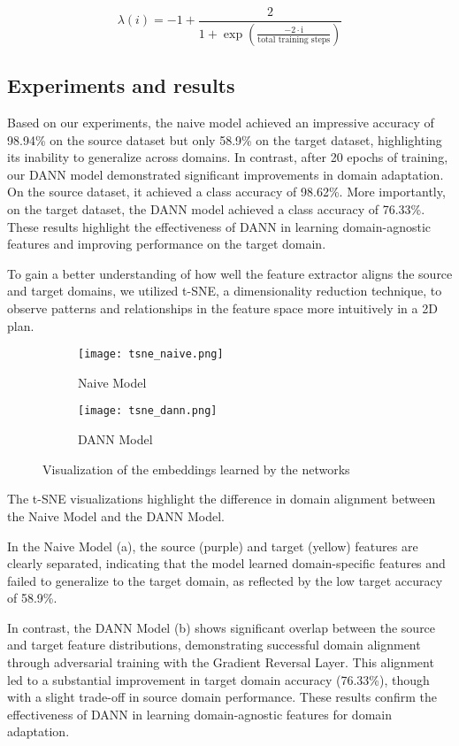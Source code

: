 \documentclass{rapportECL}
\begin{document}
\[
\lambda \left(i\right) = -1 + \frac{2}{1 + \exp \left( \frac{-2 \cdot \text{i}}{\text{total training steps}} \right)}
\]

\subsection{Experiments and results}
Based on our experiments, the naive model achieved an impressive accuracy of 98.94\% on the source dataset but only 58.9\% on the target dataset, highlighting its inability to generalize across domains. In contrast, after 20 epochs of training, our DANN model demonstrated significant improvements in domain adaptation. On the source dataset, it achieved a class accuracy of 98.62\%. More importantly, on the target dataset, the DANN model achieved a class accuracy of 76.33\%. These results highlight the effectiveness of DANN in learning  domain-agnostic features and improving performance on the target domain.


To gain a better understanding of how well the feature extractor aligns the source and target domains, we utilized t-SNE, a dimensionality reduction technique, to observe patterns and relationships in the feature space more intuitively in a 2D plan.

\begin{figure}[H]
    \centering
    \begin{subfigure}[b]{0.45\textwidth}
        \centering
        \texttt{[image: tsne\_naive.png]}
        \caption{Naive Model}
        \label{fig:sub1}
    \end{subfigure}
    \hfill
    \begin{subfigure}[b]{0.45\textwidth}
        \centering
        \texttt{[image: tsne\_dann.png]}
        \caption{DANN Model}
        \label{fig:sub2}
    \end{subfigure}
    \caption{Visualization of the embeddings learned by the networks}
    \label{fig:example}
\end{figure}
The t-SNE visualizations highlight the difference in domain alignment between the Naive Model and the DANN Model. 

In the Naive Model (a), the source (purple) and target (yellow) features are clearly separated, indicating that the model learned domain-specific features and failed to generalize to the target domain, as reflected by the low target accuracy of 58.9\%. 

In contrast, the DANN Model (b) shows significant overlap between the source and target feature distributions, demonstrating successful domain alignment through adversarial training with the Gradient Reversal Layer. This alignment led to a substantial improvement in target domain accuracy (76.33\%), though with a slight trade-off in source domain performance. These results confirm the effectiveness of DANN in learning domain-agnostic features for domain adaptation.
\end{document}
